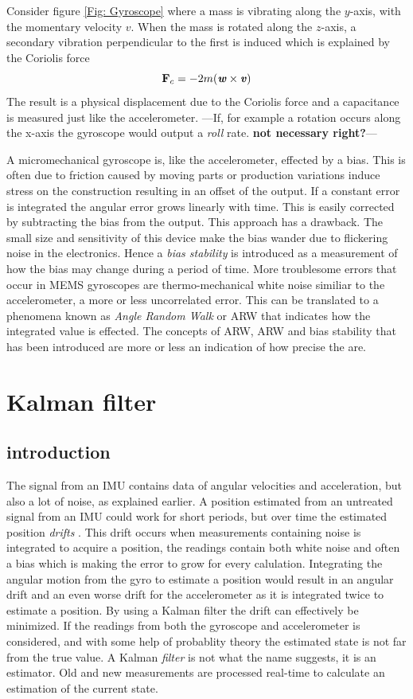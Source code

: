 \documentclass[a4paper,11pt]{kth-mag}
\begin{document}
Consider figure \ref{Fig: Gyroscope} where a mass is vibrating along the $y$-axis, with the momentary velocity $v$. When the mass is rotated along the $z$-axis, a secondary vibration perpendicular to the first is induced which is explained by the Coriolis force
\begin{equation}\label{eq:coriolis}
\textbf{F}_c = -2m(\textbf{\textit{w}} \times \textbf{\textit{v}})
\end{equation}
The result is a physical displacement due to the Coriolis force and a capacitance is measured just like the accelerometer. ---If, for example a rotation occurs along the x-axis the gyroscope would output a \textit{roll} rate. \textbf{not necessary right?}---

A micromechanical gyroscope is, like the accelerometer, effected by a bias. This is often due to friction caused by moving parts or production variations induce stress on the construction resulting in an offset of the output. If a constant error is integrated the angular error grows linearly with time. This is easily corrected by subtracting the bias from the output.
This approach has a drawback. The small size and sensitivity of this device make the bias wander due to flickering noise in the electronics. \cite{IMUintro} Hence a \textit{bias stability} is introduced as a measurement of how the bias may change during a period of time.
More troublesome errors that occur in MEMS gyroscopes are thermo-mechanical white noise similiar to the accelerometer, a more or less uncorrelated error. This can be translated to a phenomena known as \textit{Angle Random Walk} or ARW that indicates how the integrated value is effected.
The concepts of ARW, ARW and bias stability that has been introduced are more or less an indication of how precise the  are.

\section{Kalman filter}
\subsection{introduction}
The signal from an IMU contains data of angular velocities and acceleration, but also a lot of noise, as explained earlier. A position estimated from an untreated signal from an IMU could work for short periods, but over time the estimated position \textit{drifts} \cite{MEMSdrift}. This drift occurs when measurements containing noise is integrated to acquire a position, the readings contain both white noise and often a bias which is making the  error to grow for every calulation.
Integrating the angular motion from the gyro to estimate a position would result in an angular drift and an even worse drift for the accelerometer as it is integrated twice to estimate a position.
By using a Kalman filter the drift can effectively be minimized. If the readings from both the gyroscope and accelerometer is considered, and with some help of probablity theory the estimated state is not far from the true value.  A Kalman \textit{filter} is not what the name suggests, it is an estimator. Old and new measurements are processed real-time to calculate an estimation of the current state. 
\end{document}
